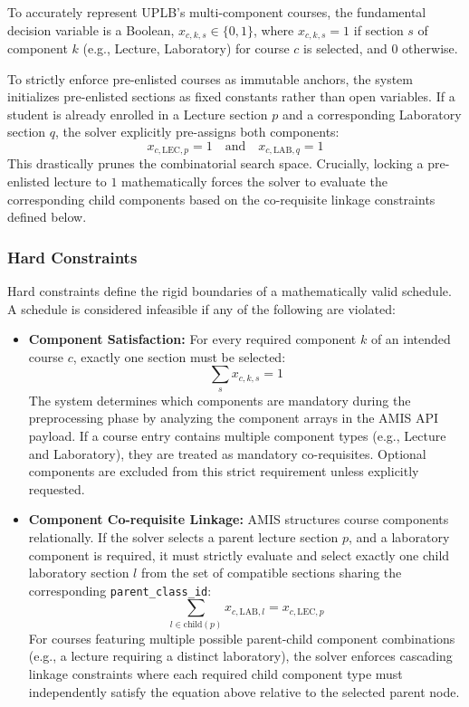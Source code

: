 \documentclass{icsthesis}
\begin{document}
\begin{mainmatter}
		To accurately represent UPLB's multi-component courses, the fundamental decision variable is a Boolean, $x_{c,k,s} \in \{0, 1\}$, where $x_{c,k,s} = 1$ if section $s$ of component $k$ (e.g., Lecture, Laboratory) for course $c$ is selected, and $0$ otherwise.
		
		To strictly enforce pre-enlisted courses as immutable anchors, the system initializes pre-enlisted sections as fixed constants rather than open variables. If a student is already enrolled in a Lecture section $p$ and a corresponding Laboratory section $q$, the solver explicitly pre-assigns both components:
		\begin{equation}
		x_{c,\text{LEC},p} = 1 \quad \text{and} \quad x_{c,\text{LAB},q} = 1
		\end{equation}
		This drastically prunes the combinatorial search space. Crucially, locking a pre-enlisted lecture to $1$ mathematically forces the solver to evaluate the corresponding child components based on the co-requisite linkage constraints defined below.
		
		\subsubsection{Hard Constraints}
		
		Hard constraints define the rigid boundaries of a mathematically valid schedule. A schedule is considered infeasible if any of the following are violated:
		
		\begin{itemize}
			\item \textbf{Component Satisfaction:} For every required component $k$ of an intended course $c$, exactly one section must be selected:
			\begin{equation}
			\sum_{s} x_{c,k,s} = 1
			\end{equation}
			The system determines which components are mandatory during the preprocessing phase by analyzing the component arrays in the AMIS API payload. If a course entry contains multiple component types (e.g., Lecture and Laboratory), they are treated as mandatory co-requisites. Optional components are excluded from this strict requirement unless explicitly requested.
			
			\item \textbf{Component Co-requisite Linkage:} AMIS structures course components relationally. If the solver selects a parent lecture section $p$, and a laboratory component is required, it must strictly evaluate and select exactly one child laboratory section $l$ from the set of compatible sections sharing the corresponding \texttt{parent\_class\_id}:
			\begin{equation}
			\sum_{l \in \text{child}(p)} x_{c,\text{LAB},l} = x_{c,\text{LEC},p}
			\end{equation}
			For courses featuring multiple possible parent-child component combinations (e.g., a lecture requiring a distinct laboratory), the solver enforces cascading linkage constraints where each required child component type must independently satisfy the equation above relative to the selected parent node.
			

\end{itemize}
\end{mainmatter}
\end{document}
